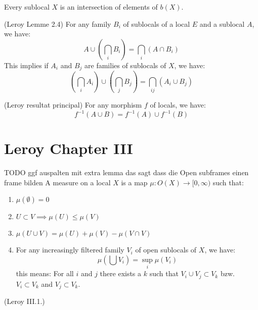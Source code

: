 \begin{lemma}
    Every sublocal $X$ is an intersection of elements of $b(X)$.
    \label{lem:b_X_generates_sublocals}
\end{lemma}


\begin{lemma}
(Leroy Lemme 2.4)
    \label{lem:union_of_intersections}
    For any family $B_i$ of sublocals of a local $E$ and a sublocal $A$, we have:
    \[A \cup (\bigcap_i B_i) = \bigcap_i (A \cap B_i)\]
    This implies if $A_i$ and $B_j$ are families of sublocals of $X$, we have:
    \[(\bigcap_i A_i)\cup(\bigcap_j B_j) =  \bigcap_{ij}(A_i \cup B_j)\]
\end{lemma}


\begin{theorem}
(Leroy resultat principal)
    \label{thm:preimage_commutes_with_unions}
    For any morphism $f$ of locals, we have:
    \[f^{-1}(A \cup B) = f^{-1}(A) \cup f^{-1}(B)\]
\end{theorem}


\chapter{Leroy Chapter III}\label{sec:leroy-chapter-iii}
\begin{definition}
    \label{def:measure_on_locals}
     TODO ggf auspalten mit extra lemma das sagt dass die Open subframes
    einen frame bilden
    \leanok
    A measure on a local $X$ is a map $\mu : O(X) \to [0,\infty)$ such that:
    \begin{enumerate}
        \item $\mu(\emptyset) = 0$
        \item $U \subset V \implies \mu(U) \le \mu(V)$
        \item $\mu(U \cup V) = \mu(U) + \mu(V) - \mu(V \cap V)$
        \item For any increasingly filtered family $V_i$ of open sublocals of $X$, we have:
        \[\mu(\bigcup V_i) = \sup_i \mu(V_i)\] this means:
        For all $i$ and $j$ there exists a $k$ such that $V_i \cup V_j \subset V_k$ bzw. $V_i \subset V_k$ and $V_j \subset V_k$.
    \end{enumerate}
    (Leroy III.1.)
\end{definition}

